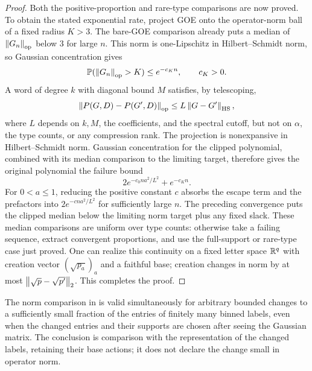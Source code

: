 \begin{proof}
Both the positive-proportion and rare-type comparisons are now proved.
To obtain the stated exponential rate, project GOE onto the
operator-norm ball of a fixed radius $K>3$.  The bare-GOE comparison
already puts a median of $\left\lVert G_n\right\rVert_{\mathrm{op}}$ below $3$ for large
$n$.  This norm is one-Lipschitz in Hilbert--Schmidt norm, so Gaussian
concentration gives
\[
 \mathbb P(\left\lVert G_n\right\rVert_{\mathrm{op}}>K)\le e^{-c_Kn},\qquad c_K>0.
\]
A word of degree $k$ with
diagonal bound $M$ satisfies, by telescoping,
\[
 \left\lVert P(G,D)-P(G',D)\right\rVert_{\mathrm{op}}
 \le L\left\lVert G-G'\right\rVert_{\mathrm{HS}},
\]
where $L$ depends on $k,M$, the coefficients, and the spectral cutoff,
but not on $\alpha$, the type counts, or any compression rank.
The projection is nonexpansive in Hilbert--Schmidt norm.  Gaussian
concentration for the clipped polynomial, combined with its median
comparison to the limiting target, therefore gives the original
polynomial the failure bound
\[
 2e^{-c_0na^2/L^2}+e^{-c_Kn}.
\]
For $0<a\le1$, reducing the positive constant $c$ absorbs the escape
term and the prefactors into $2e^{-cna^2/L^2}$ for sufficiently large
$n$.  The preceding convergence puts the clipped median below the
limiting norm target plus any fixed slack.  These median comparisons
are uniform over type counts: otherwise take a failing sequence,
extract convergent proportions, and use the full-support or rare-type
case just proved.  One can realize this continuity on a fixed letter
space $\mathbb R^q$ with creation vector $(\sqrt{p_a})_a$ and a faithful
base; creation changes in norm by at most
$\left\lVert \sqrt p-\sqrt{p'}\right\rVert_2$.  This completes the proof.
\end{proof}

\begin{lemma}
\label{lem:path-sparse}
The norm comparison in  is valid simultaneously
for arbitrary bounded changes to a sufficiently small fraction of the
entries of finitely many binned labels, even when the changed entries
and their supports are chosen after seeing the Gaussian matrix.  The
conclusion is comparison with the representation of the changed
labels, retaining their base actions; it does not declare the change
small in operator norm.
\end{lemma}

